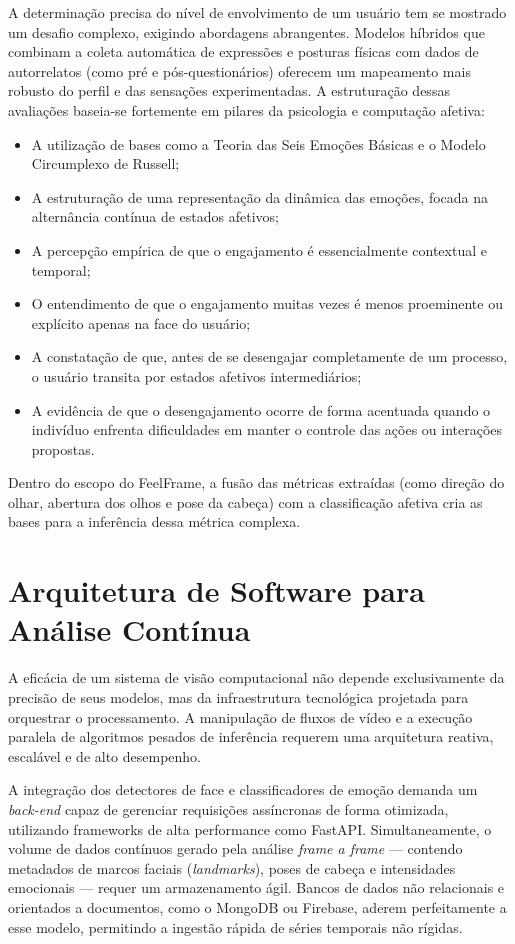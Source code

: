 \documentclass[
	12pt,
	openright,
	oneside,
	a4paper,
	english,
	brazil
	]{abntex2}
\begin{document}
A determinação precisa do nível de envolvimento de um usuário tem se mostrado um desafio complexo, exigindo abordagens abrangentes. Modelos híbridos que combinam a coleta automática de expressões e posturas físicas com dados de autorrelatos (como pré e pós-questionários) oferecem um mapeamento mais robusto do perfil e das sensações experimentadas. A estruturação dessas avaliações baseia-se fortemente em pilares da psicologia e computação afetiva:
\begin{itemize}
    \item A utilização de bases como a Teoria das Seis Emoções Básicas e o Modelo Circumplexo de Russell;
    \item A estruturação de uma representação da dinâmica das emoções, focada na alternância contínua de estados afetivos;
    \item A percepção empírica de que o engajamento é essencialmente contextual e temporal;
    \item O entendimento de que o engajamento muitas vezes é menos proeminente ou explícito apenas na face do usuário;
    \item A constatação de que, antes de se desengajar completamente de um processo, o usuário transita por estados afetivos intermediários;
    \item A evidência de que o desengajamento ocorre de forma acentuada quando o indivíduo enfrenta dificuldades em manter o controle das ações ou interações propostas.
\end{itemize}

Dentro do escopo do FeelFrame, a fusão das métricas extraídas (como direção do olhar, abertura dos olhos e pose da cabeça) com a classificação afetiva cria as bases para a inferência dessa métrica complexa.

\section{Arquitetura de Software para Análise Contínua}

A eficácia de um sistema de visão computacional não depende exclusivamente da precisão de seus modelos, mas da infraestrutura tecnológica projetada para orquestrar o processamento. A manipulação de fluxos de vídeo e a execução paralela de algoritmos pesados de inferência requerem uma arquitetura reativa, escalável e de alto desempenho.

A integração dos detectores de face e classificadores de emoção demanda um \textit{back-end} capaz de gerenciar requisições assíncronas de forma otimizada, utilizando frameworks de alta performance como FastAPI. Simultaneamente, o volume de dados contínuos gerado pela análise \textit{frame a frame} --- contendo metadados de marcos faciais (\textit{landmarks}), poses de cabeça e intensidades emocionais --- requer um armazenamento ágil. Bancos de dados não relacionais e orientados a documentos, como o MongoDB ou Firebase, aderem perfeitamente a esse modelo, permitindo a ingestão rápida de séries temporais não rígidas.
\end{document}
